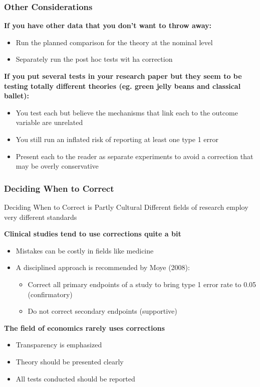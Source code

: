 \documentclass[10pt, block=fill]{beamer}
\begin{document}
\begin{frame}
  \frametitle{Other Considerations}
  
  \textbf{If you have other data that you don't want to throw away:}
  \begin{itemize}
    \item Run the planned comparison for the theory at the nominal level
    \item Separately run the post hoc tests wit ha correction
  \end{itemize}
 
 \vspace{0.2in}
 
  \textbf{If you put several tests in your research paper but they seem to be testing totally different theories (eg. green jelly beans and classical ballet):}
  \begin{itemize}
    \item You test each but believe the mechanisms that link each to the outcome variable are unrelated
    \item You still run an inflated risk of reporting at least one type 1 error
    \item Present each to the reader as separate experiments to avoid a correction that may be overly conservative
  \end{itemize}
    
\end{frame}


\begin{frame}
  \frametitle{Deciding When to Correct}
  
  \begin{block}{Deciding When to Correct is Partly Cultural}
    Different fields of research employ very different standards
  \end{block}

  \textbf{Clinical studies tend to use corrections quite a bit}
  \begin{itemize}
    \item Mistakes can be costly in fields like medicine
    \item A disciplined approach is recommended by Moye (2008):
    \begin{itemize}
      \item Correct all primary endpoints of a study to bring type 1 error rate to 0.05 (confirmatory)
      \item Do not correct secondary endpoints (supportive)
    \end{itemize}
  \end{itemize}
  
  \vspace{0.2in} 
  
  \textbf{The field of economics rarely uses corrections}
  \begin{itemize}
    \item Transparency is emphasized
    \item Theory should be presented clearly
    \item All tests conducted should be reported
  \end{itemize}
  
\end{frame}
\end{document}
